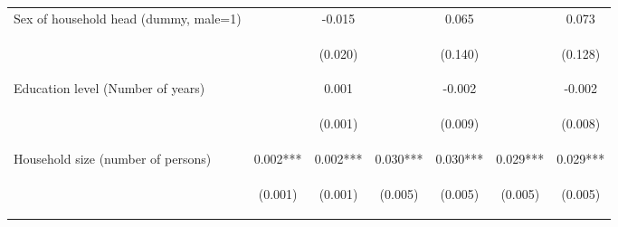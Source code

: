\begin{center}
\begin{tabular}{lcccccc}
Sex of household head (dummy, male=1) &  & -0.015 &  & 0.065 &  & 0.073 \\
\vspace{4pt} & \begin{footnotesize}\end{footnotesize} & \begin{footnotesize}(0.020)\end{footnotesize} & \begin{footnotesize}\end{footnotesize} & \begin{footnotesize}(0.140)\end{footnotesize} & \begin{footnotesize}\end{footnotesize} & \begin{footnotesize}(0.128)\end{footnotesize} \\
Education level (Number of years) &  & 0.001 &  & -0.002 &  & -0.002 \\
\vspace{4pt} & \begin{footnotesize}\end{footnotesize} & \begin{footnotesize}(0.001)\end{footnotesize} & \begin{footnotesize}\end{footnotesize} & \begin{footnotesize}(0.009)\end{footnotesize} & \begin{footnotesize}\end{footnotesize} & \begin{footnotesize}(0.008)\end{footnotesize} \\
Household size (number of persons) & 0.002*** & 0.002*** & 0.030*** & 0.030*** & 0.029*** & 0.029*** \\
\vspace{4pt} & \begin{footnotesize}(0.001)\end{footnotesize} & \begin{footnotesize}(0.001)\end{footnotesize} & \begin{footnotesize}(0.005)\end{footnotesize} & \begin{footnotesize}(0.005)\end{footnotesize} & \begin{footnotesize}(0.005)\end{footnotesize} & \begin{footnotesize}(0.005)\end{footnotesize} \\

\end{tabular}
\end{center}
